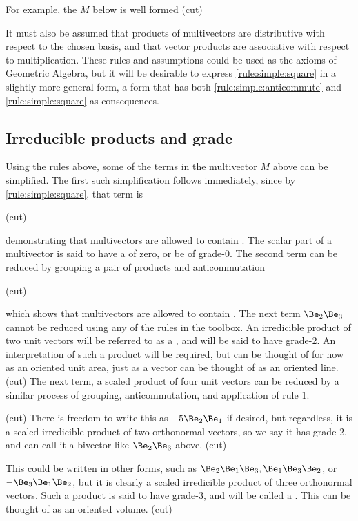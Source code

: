 %
%
For example, the  \( M \) below is well formed
(cut)

It must also be assumed that products of multivectors are distributive with respect to the chosen basis, and that vector products are associative with respect to multiplication.
These rules and assumptions could be used as the axioms of Geometric Algebra, but it will be desirable to express \ref{rule:simple:square} in a slightly more general form, a form that has both \ref{rule:simple:anticommute} and \ref{rule:simple:square} as consequences.

\subsection{Irreducible products and grade}

Using the rules above, some of the terms in the multivector \( M \) above can be simplified.
The first such simplification follows immediately, since by \ref{rule:simple:square}, that term is

(cut)

demonstrating that multivectors are allowed to contain .
The scalar part of a multivector is said to have a  of zero, or be of grade-0.
The second term can be reduced by grouping a pair of products and anticommutation

(cut)

which shows that multivectors are allowed to contain .
The next term \( \Be_2 \Be_3 \) cannot be reduced using any of the rules in the toolbox.
An irredicible product of two unit vectors will be referred to as a , and will be said to have grade-2.
An interpretation of such a product will be required, but can be thought of for now as an oriented unit area, just as a vector can be thought of as an oriented line.
(cut)
The next term, a scaled product of four unit vectors can be reduced by a similar process of grouping, anticommutation, and application of rule 1.

(cut)
There is freedom to write this as \( - 5 \Be_2 \Be_1 \) if desired, but regardless, it is a
scaled irredicible product of two orthonormal vectors, so we say it has grade-2, and can call it a bivector like \( \Be_2 \Be_3 \) above.
(cut)

This could be written in other forms, such as \( \Be_2 \Be_1 \Be_3, \Be_1 \Be_3 \Be_2 \), or \( -\Be_3 \Be_1 \Be_2 \), but it is clearly a scaled irredicible product of three orthonormal vectors.
Such a product is said to have grade-3, and will be called a .
This can be thought of as an oriented volume.
(cut)

